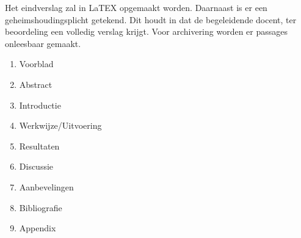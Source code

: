 Het eindverslag zal in LaTEX opgemaakt worden. Daarnaast is er een geheimshoudingsplicht getekend. Dit houdt in dat de begeleidende docent, ter beoordeling een volledig verslag krijgt. Voor archivering worden er passages onleesbaar gemaakt. 

\begin{enumerate}
	\item Voorblad
	\item Abstract
	\item Introductie
	\item Werkwijze/Uitvoering
	\item Resultaten
	\item Discussie
	\item Aanbevelingen
	\item Bibliografie
	\item Appendix
\end{enumerate}